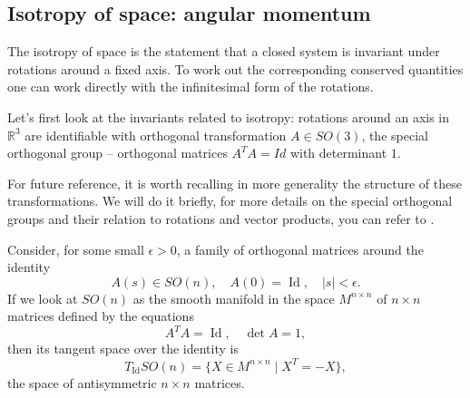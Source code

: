 \documentclass[english,fontsize=11pt,paper=a5,oneside]{scrbook}
\newcommand{\R}{\mathbb{R}}
\DeclareMathOperator{\Id}{Id}
\theoremstyle{definition}
\begin{document}
\subsection{Isotropy of space: angular momentum}\label{sec:angm}

The isotropy of space is the statement that a closed system is invariant under rotations around a fixed axis. To work out the corresponding conserved quantities one can work directly with the infinitesimal form of the rotations.

Let's first look at the invariants related to isotropy:
rotations around an axis in $\R^3$ are identifiable with orthogonal transformation $A\in SO(3)$, the special orthogonal group -- orthogonal matrices $A^TA = Id$ with determinant $1$.

For future reference, it is worth recalling in more generality the structure of these transformations. We will do it briefly, for more details on the special orthogonal groups and their relation to rotations and vector products, you can refer to \cite{book:marsdenratiu}. 

Consider, for some small $\epsilon > 0$, a family of orthogonal matrices around the identity
\begin{equation}\label{eq:familyson}
    A(s) \in SO(n), \quad A(0) = \Id, \quad |s| < \epsilon.
\end{equation}
If we look at $SO(n)$ as the smooth manifold in the space $M^{n\times n}$ of $n\times n$ matrices defined by the equations
\begin{equation}
    A^T A = \Id,\quad \det A = 1,
\end{equation}
then its tangent space over the identity is
\begin{equation}
    T_{\Id} SO(n) = \big\{X\in M^{n\times n}\mid X^T = -X\big\},
\end{equation}
the space of antisymmetric $n\times n$ matrices.
\end{document}
